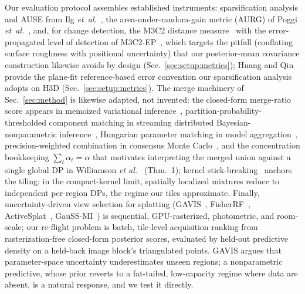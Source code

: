  Our evaluation protocol assembles established instruments:
sparsification analysis and AUSE from Ilg
\emph{et~al.}~\cite{ilg2018uncertainty}, the area-under-random-gain
metric (AURG)
of Poggi \emph{et~al.}~\cite{poggi2020uncertainty}, and, for change
detection, the M3C2 distance measure~\cite{lague2013m3c2} with the
error-propagated level of detection of
M3C2-EP~\cite{winiwarter2021m3c2ep}, which targets the pitfall
(conflating surface roughness with positional uncertainty) that our
posterior-mean covariance construction likewise avoids by design
(Sec.~\ref{sec:setup:metrics}); Huang and Qin~\cite{huang2025uncertainty}
provide the plane-fit reference-based error convention our
sparsification analysis adopts on H3D
(Sec.~\ref{sec:setup:metrics}). The
merge machinery of Sec.~\ref{sec:method} is likewise adapted, not
invented: the closed-form merge-ratio score appears in memoized
variational inference~\cite{hughes2013memoized},
partition-probability-thresholded component matching in streaming
distributed Bayesian-nonparametric
inference~\cite{campbell2015streaming}, Hungarian parameter matching in
model aggregation~\cite{yurochkin2019spahm}, precision-weighted
combination in consensus Monte Carlo~\cite{scott2016consensus}, and the
concentration bookkeeping $\sum_t \alpha_t = \alpha$ that motivates
interpreting the merged union against a single global DP in Williamson
\emph{et al.}~\cite{williamson2013parallel} (Thm.~1); kernel
stick-breaking~\cite{dunson2008kernel} anchors the tiling: in the
compact-kernel limit, spatially localized mixtures reduce to
independent per-region DPs, the regime our tiles approximate.
Finally, uncertainty-driven view selection for splatting
(GAVIS~\cite{xue2026gavis}, FisherRF~\cite{jiang2024fisherrf},
ActiveSplat~\cite{li2025activesplat}, GauSS-MI~\cite{xie2025gaussmi}) is
sequential, GPU-rasterized, photometric, and room-scale; our re-flight
problem is batch, tile-level acquisition
ranking from rasterization-free closed-form posterior scores, evaluated
by held-out predictive density on a held-back image block's
triangulated points. GAVIS argues that parameter-space
uncertainty underestimates unseen regions; a nonparametric predictive,
whose prior reverts to a fat-tailed, low-capacity regime where data are
absent, is a natural response, and we test it directly.
